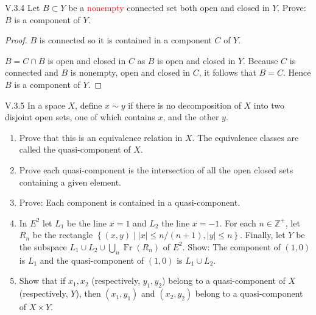 \begin{problem}{V.3.4}\label{problem:V.3.4}
Let \( B \subset Y \) be a \textcolor{red}{nonempty} connected set both open and closed in \( Y \). Prove: \(B\) is a component of \(Y\).
\end{problem}

\begin{proof}
	\( B \) is connected so it is contained in a component \( C \) of \( Y \).

	\( B = C \cap B \) is open and closed in \( C \) as \( B \) is open and closed in \( Y \). Because \( C \) is connected and \( B \) is nonempty, open and closed in \( C \), it follows that \( B = C \). Hence \( B \) is a component of \( Y \).
\end{proof}

\begin{problem}{V.3.5}
In a space \(X\), define \( x \sim y \) if there is no decomposition of \(X\) into two disjoint open sets, one of which contains \(x\), and the other \(y\).
\begin{enumerate}[label={(\alph*)}]
	\item Prove that this is an equivalence relation in \(X\). The equivalence classes are called the quasi-component of \(X\).
	\item Prove each quasi-component is the intersection of all the open closed sets containing a given element.
	\item Prove: Each component is contained in a quasi-component.
	\item In \(E^{2}\) let \(L_{1}\) be the line \( x = 1 \) and \(L_{2}\) the line \(x = -1\). For each \( n \in \mathbb{Z}^{+} \), let \( R_{n} \) be the rectangle \( \left\{ (x, y) \mid \left\vert x\right\vert \le n/(n + 1), \left\vert y\right\vert \le n \right\} \). Finally, let \(Y\) be the subspace \( L_{1} \cup L_{2} \cup \bigcup_{n} \operatorname{Fr}(R_{n}) \) of \( E^{2} \). Show: The component of \( (1, 0) \) is \( L_{1} \) and the quasi-component of \( (1, 0) \) is \( L_{1} \cup L_{2} \).
	\item Show that if \( x_{1}, x_{2} \) (respectively, \( y_{1}, y_{2} \)) belong to a quasi-component of \(X\) (respectively, \(Y\)), then \( (x_{1}, y_{1}) \) and \( (x_{2}, y_{2}) \) belong to a quasi-component of \( X \times Y \).
\end{enumerate}
\end{problem}

